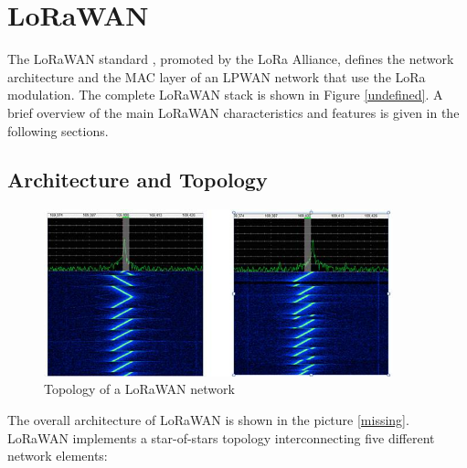 \section{LoRaWAN}

The LoRaWAN standard \cite{undefined}, promoted by the LoRa Alliance, defines the network architecture and the MAC layer of an \gls{LPWAN} network that use the LoRa modulation. The complete LoRaWAN stack is shown in Figure \ref{undefined}. A brief overview of the main LoRaWAN characteristics and features is given in the following sections.

\subsection{Architecture and Topology}

\begin{figure}[h]
    \centering
    \includegraphics[draft, width=0.9\textwidth]{images/lora-chirps.jpg}
    \caption{Topology of a LoRaWAN network}
    \label{fig:lorawan-architecture}
\end{figure}

The overall architecture of LoRaWAN is shown in the picture \ref{missing}.
LoRaWAN implements a star-of-stars topology interconnecting five different network elements:


